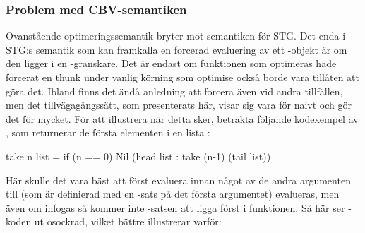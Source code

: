 \documentclass[../Optimise]{subfiles}
\begin{document}
%


\subsubsection{Problem med CBV-semantiken}
\label{CBV:Problem}

Ovanstående optimeringssemantik bryter mot semantiken för STG. 
Det enda i STG:s semantik som kan framkalla en forcerad evaluering av ett
-objekt är om den ligger i en -granskare. 
Det är endast om funktionen som optimeras hade forcerat en thunk under vanlig 
körning som optimise också borde vara tillåten att göra det. Ibland finns 
det ändå anledning att forcera även vid andra tillfällen, men det tillvägagångssätt,
som presenterats här, visar sig vara för naivt och gör det för mycket. För
att illustrera när detta sker, betrakta följande kodexempel av ,
som returnerar de första  elementen i en lista :

\begin{codeEx}
take n list = if (n == 0) 
                 Nil 
                 (head list : take (n-1) (tail list))
\end{codeEx}

Här skulle det vara bäst att först evaluera  innan något av de andra argumenten till  
(som är definierad med en -sats på det första argumentet) evalueras, men även om
 infogas så kommer inte -satsen att ligga först i funktionen. 
Så här ser -koden ut osockrad, vilket bättre illustrerar varför:
\end{document}
